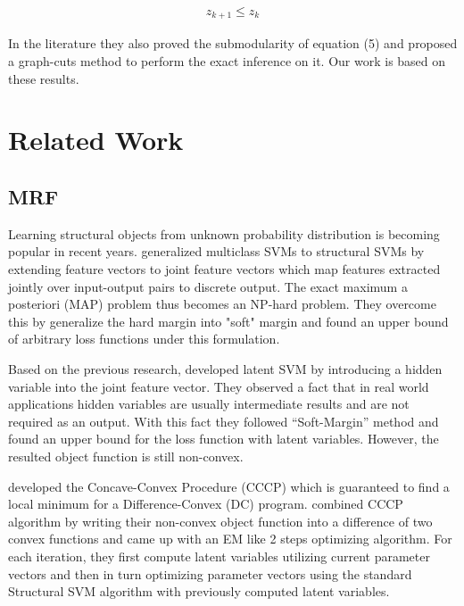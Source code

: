\documentclass[twoside,doublespace,onecolumn,11pt,a4paper]{book}
\renewcommand{\citename}{\citet}
\renewcommand{\cite}{\citep}
\begin{document}
\begin{align}
  z_{k+1}\le z_k
\end{align}

In the literature they also proved the submodularity of equation
(5) and proposed a graph-cuts method to perform the exact
inference on it. Our work is based on these results.


\section{Related Work}
\subsection{MRF}
Learning structural objects from unknown probability distribution
is becoming popular in recent years.
\citename{tsochantaridis2005large} generalized multiclass
SVMs\cite{crammer2002algorithmic} to structural SVMs by extending
feature vectors to joint feature vectors which map features
extracted jointly over input-output pairs to discrete output. The
exact maximum a posteriori (MAP) problem thus becomes an NP-hard
problem. They overcome this by generalize the hard margin into
"soft" margin and found an upper bound of arbitrary loss
functions under this formulation.

Based on the previous research, \citename{yu2009learning}
developed latent SVM by introducing a hidden variable into the
joint feature vector. They observed a fact that in real world
applications hidden variables are usually intermediate results
and are not required as an output. With this fact they followed
“Soft-Margin” method and found an upper bound for the loss
function with latent variables. However, the resulted object
function is still non-convex.

\citename{yuille2002concave} developed the Concave-Convex
Procedure (CCCP) which is guaranteed to find a local minimum for
a Difference-Convex (DC) program. \citename{yu2009learning}
combined CCCP algorithm by writing their non-convex object
function into a difference of two convex functions and came up
with an EM like 2 steps optimizing algorithm. For each iteration,
they first compute latent variables utilizing current parameter
vectors and then in turn optimizing parameter vectors using the
standard Structural SVM algorithm with previously computed latent
variables.
\end{document}
